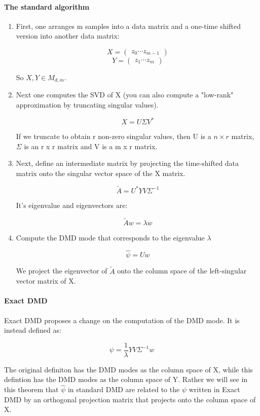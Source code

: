 \documentclass{article}
\theoremstyle{definition}
\theoremstyle{remark}
\theoremstyle{lemma}
\theoremstyle{theorem}
\theoremstyle{corollary}
\theoremstyle{property}
\begin{document}
		\paragraph{The standard algorithm}
			\begin{enumerate}
				\item First, one arranges m samples into a data matrix and a one-time shifted version into another data matrix:

					$$X = \begin{pmatrix} z_0 \cdots z_{m-1} \end{pmatrix}$$
					$$Y = \begin{pmatrix} z_1 \cdots z_{m} \end{pmatrix}$$

				So $X, Y \in M_{d, m}$.
				\item Next one computes the SVD of X (you can also compute a "low-rank" approximation by truncating singular values). 

					$$X = U\Sigma V^*$$

				If we truncate to obtain r non-zero singular values, then U is a $n \times r$ matrix, $\Sigma$ is an r x r matrix and V is a m x r matrix.

				\item Next, define an intermediate matrix by projecting the time-shifted data matrix onto the singular vector space of the X matrix.

					$$\tilde{A} = U^* Y V \Sigma^{-1}$$

				It's eigenvalue and eigenvectors are:

					$$\tilde{A} w = \lambda w$$

				\item Compute the DMD mode that corresponds to the eigenvalue $\lambda$

					$$\hat{\psi} = Uw$$

				We project the eigenvector of $\tilde{A}$ onto the column space of the left-singular vector matrix of X.
			\end{enumerate}

		\paragraph{Exact DMD}
			Exact DMD proposes a change on the computation of the DMD mode. It is instead defined as:

				$$\psi = \frac{1}{\lambda} Y V \Sigma^{-1} w$$

			The original definiton has the DMD modes as the column space of X, while this defintion has the DMD modes as the column space of Y. Rather we will see in this theorem that $\hat{\psi}$ in standard DMD are related to the $\psi$ written in Exact DMD by an orthogonal projection matrix that projects onto the column space of X.
\end{document}
